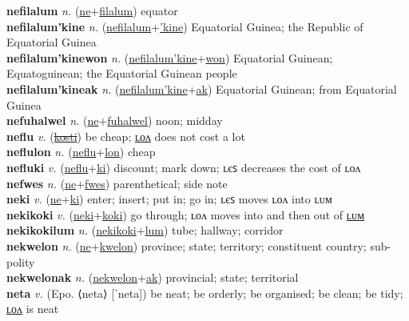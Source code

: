 \textbf{nefilalum} \textit{n.} (\hyperref[ne]{ne}+\hyperref[filalum]{filalum})
equator \label{nefilalum} \\
\textbf{nefilalum'kine} \textit{n.} (\hyperref[nefilalum]{nefilalum}+\hyperref['kine]{'kine})
Equatorial Guinea; the Republic of Equatorial Guinea \label{nefilalum'kine} \\
\textbf{nefilalum'kinewon} \textit{n.} (\hyperref[nefilalum'kine]{nefilalum'kine}+\hyperref[won]{won})
Equatorial Guinean; Equatoguinean; the Equatorial Guinean people \label{nefilalum'kinewon} \\
\textbf{nefilalum'kineak} \textit{n.} (\hyperref[nefilalum'kine]{nefilalum'kine}+\hyperref[ak]{ak})
Equatorial Guinean; from Equatorial Guinea \label{nefilalum'kineak} \\
\textbf{nefuhalwel} \textit{n.} (\hyperref[ne]{ne}+\hyperref[fuhalwel]{fuhalwel})
noon; midday \label{nefuhalwel} \\
\textbf{neflu} \textit{v.} (\hyperref[kosti]{\sout{kosti}})
be cheap; \hyperref[neflulon]{ʟᴏᴧ} does not cost a lot \label{neflu} \\
\textbf{neflulon} \textit{n.} (\hyperref[neflu]{neflu}+\hyperref[lon]{lon})
cheap \label{neflulon} \\
\textbf{nefluki} \textit{v.} (\hyperref[neflu]{neflu}+\hyperref[ki]{ki})
discount; mark down; ʟєꜱ decreases the cost of ʟᴏᴧ \label{nefluki} \\
\textbf{nefwes} \textit{n.} (\hyperref[ne]{ne}+\hyperref[fwes]{fwes})
parenthetical; side note \label{nefwes} \\
\textbf{neki} \textit{v.} (\hyperref[ne]{ne}+\hyperref[ki]{ki})
enter; insert; put in; go in; ʟєꜱ moves ʟᴏᴧ into ʟᴜᴍ \label{neki} \\
\textbf{nekikoki} \textit{v.} (\hyperref[neki]{neki}+\hyperref[koki]{koki})
go through; ʟᴏᴧ moves into and then out of \hyperref[nekikokilum]{ʟᴜᴍ} \label{nekikoki} \\
\textbf{nekikokilum} \textit{n.} (\hyperref[nekikoki]{nekikoki}+\hyperref[lum]{lum})
tube; hallway; corridor \label{nekikokilum} \\
\textbf{nekwelon} \textit{n.} (\hyperref[ne]{ne}+\hyperref[kwelon]{kwelon})
province; state; territory; constituent country; sub-polity \label{nekwelon} \\
\textbf{nekwelonak} \textit{n.} (\hyperref[nekwelon]{nekwelon}+\hyperref[ak]{ak})
provincial; state; territorial \label{nekwelonak} \\
\textbf{neta} \textit{v.} (Epo. ⟨neta⟩ [ˈneta])
be neat; be orderly; be organised; be clean; be tidy; \hyperref[netalon]{ʟᴏᴧ} is neat \label{neta} \\
